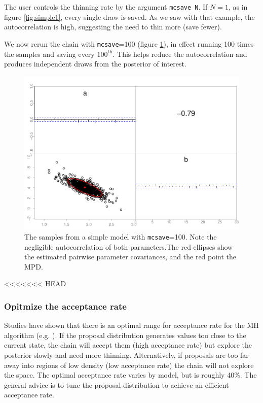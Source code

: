 \documentclass{article}\usepackage[]{graphicx}\usepackage[]{color}
\begin{document}
The user controls the thinning rate by the argument
\texttt{mcsave N}. If $N=1$, as in figure \ref{fig:simple1},
every single draw is saved. As we saw with that example, the
autocorrelation is high, suggesting the need to thin more
(save fewer).

We now rerun the chain with \texttt{mcsave}=100 (figure
\ref{fig:simple2}), in effect running 100 times the samples
and saving every $100^{\text{th}}$. This helps reduce the
autocorrelation and produces independent draws from the
posterior of interest.
\begin{figure}[h]
  \centering
  \includegraphics[width=5in]{../plots/simple2.pdf}
  \caption{The samples from a simple model with
    \texttt{mcsave}=100. Note the negligible autocorrelation
    of both parameters.The red ellipses show the estimated
    pairwise parameter covariances, and the red point the
    MPD.}
  \label{fig:simple2}
\end{figure}
<<<<<<< HEAD

\subsubsection{Opitmize the acceptance rate}
Studies have shown that there is an optimal range for
acceptance rate for the MH algorithm
(e.g. \cite{roberts2001}). If the proposal distribution
generates values too close to the current state, the chain
will accept them (high acceptance rate) but explore the
posterior slowly and need more thinning. Alternatively, if
proposals are too far away into regions of low density (low
acceptance rate) the chain will not explore the space. The
optimal acceptance rate varies by model, but is roughly
40\%. The general advice is to tune the proposal
distribution to achieve an efficient acceptance rate.
\end{document}
